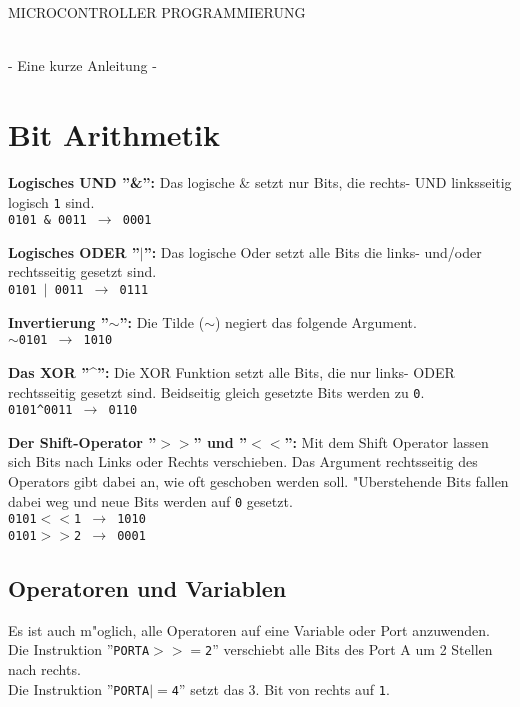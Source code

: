 \documentclass[11pt,a4paper,smallheadings,twocolumn,headexclude,footexclude]{scrartcl}
\begin{document}
\begin{center}
\begin{huge}
MICROCONTROLLER PROGRAMMIERUNG
\end{huge}\\\vspace{2mm}
\large{- Eine kurze Anleitung -}
\end{center}
\vspace{2mm}
\section*{Bit Arithmetik}
{\bf Logisches UND ''\&'':}
	Das logische \& setzt nur Bits, die rechts- UND linksseitig logisch \texttt{1}
	sind.
	\\\texttt{0101 \& 0011 $\rightarrow$ 0001}

\vspace{2mm}

{\bf Logisches ODER ''$|$'':}
Das logische Oder setzt alle Bits die links- und/oder rechtsseitig gesetzt sind.
\\\texttt{0101 $|$ 0011 $\rightarrow$ 0111}

\vspace{2mm}

{\bf Invertierung ''$\sim$'':}
Die Tilde ($\sim$) negiert das folgende Argument.
\\\texttt{$\sim$0101 $\rightarrow$ 1010}

\vspace{2mm}

{\bf Das XOR ''\textasciicircum'':}
Die XOR Funktion setzt alle Bits, die nur links- ODER rechtsseitig
gesetzt sind. Beidseitig gleich gesetzte Bits werden zu \texttt{0}.
\\\texttt{0101{\textasciicircum}0011 $\rightarrow$ 0110}

\vspace{2mm}

{\bf Der Shift-Operator ''$>>$'' und ''$<<$'':}
Mit dem Shift Operator lassen sich Bits nach Links oder Rechts verschieben. Das Argument rechtsseitig des
Operators gibt dabei an, wie oft geschoben werden soll. "Uberstehende Bits fallen dabei weg und neue Bits
werden auf \texttt{0} gesetzt.
\\\texttt{0101$<<$1 $\rightarrow$ 1010}
\\\texttt{0101$>>$2 $\rightarrow$ 0001}

\subsection*{Operatoren und Variablen}
Es ist auch m"oglich, alle Operatoren auf eine Variable oder Port anzuwenden. Die
Instruktion ''\texttt{PORTA$>>=$2}'' verschiebt alle Bits des Port A um 2 Stellen nach rechts.
\\
Die Instruktion ''\texttt{PORTA$|=$4}'' setzt das 3. Bit von rechts auf \texttt{1}.
\end{document}
